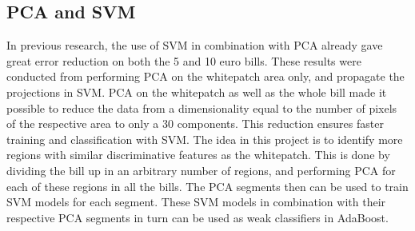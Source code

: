 \documentclass[11pt,twocolumn]{article}
\begin{document}
		\subsection{PCA and SVM}\label{sec:PCA}
			\hspace*{10px}In previous research, the use of SVM in combination with PCA already gave great error reduction on both the 5 and 10 euro bills. These results were conducted from performing PCA on the whitepatch area only, and propagate the projections in SVM. PCA on the whitepatch as well as the whole bill made it possible to reduce the data from a dimensionality equal to the number of pixels of the respective area to only a 30 components. This reduction ensures faster training and classification with SVM. The idea in this project is to identify more regions with similar discriminative features as the whitepatch. This is done by dividing the bill up in an arbitrary number of regions, and performing PCA for each of these regions in all the bills. The PCA segments then can be used to train SVM models for each segment. These SVM models in combination with their respective PCA segments in turn can be used as weak classifiers in AdaBoost.
\end{document}
